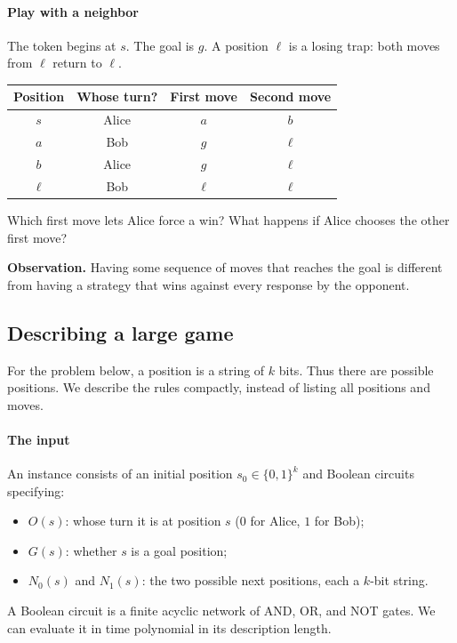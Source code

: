 \documentclass[11  pt]{article}
\begin{document}
\paragraph{Play with a neighbor}
The token begins at $s$. The goal is $g$. A position $\ell$ is a losing trap: both moves from $\ell$ return to $\ell$.
\begin{center}
    \begin{tabular}{c|c|c|c}
        Position & Whose turn? & First move & Second move \\
        \hline
        $s$ & Alice & $a$ & $b$ \\
        $a$ & Bob & $g$ & $\ell$ \\
        $b$ & Alice & $g$ & $\ell$ \\
        $\ell$ & Bob & $\ell$ & $\ell$
    \end{tabular}
\end{center}
Which first move lets Alice force a win? What happens if Alice chooses the other first move?
\vs{1.5cm}

\vfill
\textbf{Observation.} Having some sequence of moves that reaches the goal is different from having a strategy that wins against every response by the opponent.

\newpage
\subsection*{Describing a large game}
For the problem below, a position is a string of $k$ bits. Thus there are  possible positions. We describe the rules compactly, instead of listing all positions and moves.

\paragraph{The input}
An instance consists of an initial position $s_0\in\{0,1\}^k$ and Boolean circuits specifying:
\begin{itemize}
    \item $O(s)$: whose turn it is at position $s$ ($0$ for Alice, $1$ for Bob);
    \item $G(s)$: whether $s$ is a goal position;
    \item $N_0(s)$ and $N_1(s)$: the two possible next positions, each a $k$-bit string.
\end{itemize}
A Boolean circuit is a finite acyclic network of AND, OR, and NOT gates. We can evaluate it in time polynomial in its description length.
\end{document}
